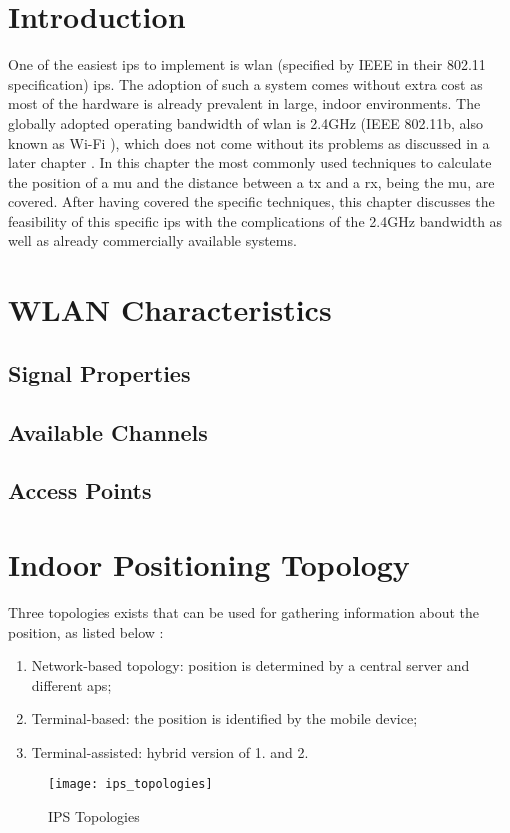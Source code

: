 \section{Introduction}
One of the easiest \acrlong{ips} to implement is \acrshort{wlan} (specified by IEEE in their 802.11 specification) \acrshort{ips}. The adoption of such a system comes without extra cost as most of the hardware is already prevalent in large, indoor environments.  The globally adopted operating bandwidth of \acrshort{wlan} is 2.4GHz (IEEE 802.11b, also known as Wi-Fi \cite{Li}), which does not come without its problems as discussed in a later chapter \cite{Techopedia} \cite{ElectronicsNotes}\cite{Cisco}. In this chapter the most commonly used techniques to calculate the position of a \acrlong{mu} and the distance between a \acrlong{tx} and a \acrlong{rx}, being the \acrlong{mu}, are covered. After having covered the specific techniques, this chapter discusses the feasibility of this specific \acrlong{ips} with the complications of the 2.4GHz bandwidth as well as already commercially available systems.
\section{WLAN Characteristics}
\subsection{Signal Properties}
\subsection{Available Channels}
\subsection{Access Points}
\section{Indoor Positioning Topology}
Three topologies exists that can be used for gathering information about the position, as listed below \cite{Henniges2012}:
\begin{enumerate}
\item Network-based topology: position is determined by a central server and different \acrshort{ap}s;
\item Terminal-based: the position is identified by the mobile device;
\item Terminal-assisted: hybrid version of 1. and 2.
\end{enumerate}
\begin{figure}[h!]
\centering
\texttt{[image: ips\_topologies]}
\caption{IPS Topologies ~\cite{Henniges2012}}
\label{fig:ips_topologies}
\end{figure}
